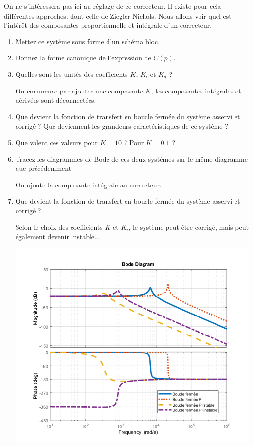 On ne s'intéressera pas ici au réglage de ce correcteur. Il existe pour cela différentes approches, dont celle de Ziegler-Nichols. Nous allons voir quel est l'intérêt des composantes proportionnelle et intégrale d'un correcteur.

\begin{enumerate}
	\item Mettez ce système sous forme d'un schéma bloc.
	\item Donnez la forme canonique de l'expression de $C(p)$.
	\item Quelles sont les unités des coefficients $K$, $K_i$ et $K_d$ ?

	\medskip
	
	On commence par ajouter une composante $K$, les composantes intégrales et dérivées sont déconnectées.
	
	\item Que devient la fonction de transfert en boucle fermée du système asservi et corrigé ? Que deviennent les grandeurs caractéristiques de ce système ?
	\item Que valent ces valeurs pour $K = 10$ ? Pour $K = 0.1$ ?
	\item Tracez les diagrammes de Bode de ces deux systèmes sur le même diagramme que précédemment.
	
	\medskip
	
	On ajoute la composante intégrale au correcteur.
	
	\item Que devient la fonction de transfert en boucle fermée du système asservi et corrigé ? 
	
	\medskip	
	
	Selon le choix des coefficients $K$ et $K_i$, le système peut être corrigé, mais peut également devenir instable...
	
	\begin{center}
		\includegraphics[width=14cm]{images/TD/bode_PI_corr.png}
	\end{center}	
	

\end{enumerate}
